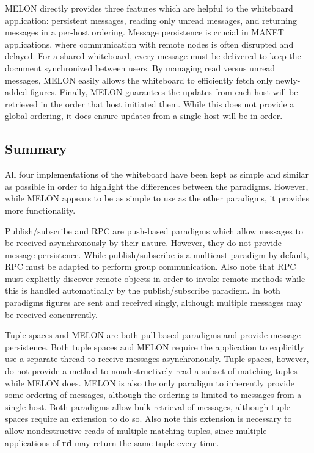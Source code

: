 \documentclass{llncs}
\begin{document}
MELON directly provides three features which are helpful to the whiteboard application: persistent messages, reading only unread messages, and returning messages in a per-host ordering. Message persistence is crucial in MANET applications, where communication with remote nodes is often disrupted and delayed. For a shared whiteboard, every message must be delivered to keep the document synchronized between users. By managing read versus unread messages, MELON easily allows the whiteboard to efficiently fetch only newly-added figures. Finally, MELON guarantees the updates from each host will be retrieved in the order that host initiated them. While this does not provide a global ordering, it does ensure updates from a single host will be in order.

\subsection{Summary}

All four implementations of the whiteboard have been kept as simple and similar as possible in order to highlight the differences between the paradigms. However, while MELON appears to be as simple to use as the other paradigms, it provides more functionality.

Publish/subscribe and RPC are push-based paradigms which allow messages to be received asynchronously by their nature. However, they do not provide message persistence. While publish/subscribe is a multicast paradigm by default, RPC must be adapted to perform group communication. Also note that RPC must explicitly discover remote objects in order to invoke remote methods while this is handled automatically by the publish/subscribe paradigm. In both paradigms figures are sent and received singly, although multiple messages may be received concurrently.

Tuple spaces and MELON are both pull-based paradigms and provide message persistence. Both tuple spaces and MELON require the application to explicitly use a separate thread to receive messages asynchronously. Tuple spaces, however, do not provide a method to nondestructively read a subset of matching tuples while MELON does. MELON is also the only paradigm to inherently provide some ordering of messages, although the ordering is limited to messages from a single host. Both paradigms allow bulk retrieval of messages, although tuple spaces require an extension to do so. Also note this extension is necessary to allow nondestructive reads of multiple matching tuples, since multiple applications of \textbf{rd} may return the same tuple every time.
\end{document}
